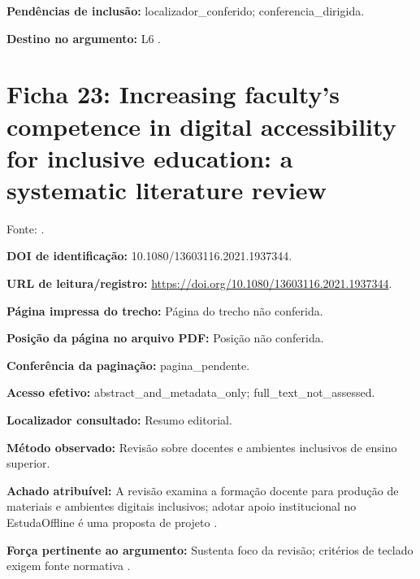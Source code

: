 \noindent\textbf{Pendências de inclusão:} localizador\_conferido; conferencia\_dirigida.\par\medskip

\noindent\textbf{Destino no argumento:} L6 .

\clearpage\section*{Ficha 23: Increasing faculty’s competence in digital accessibility for inclusive education: a systematic literature review}

Fonte: \citet{bong2021}.

\noindent\textbf{DOI de identificação:} 10.1080/13603116.2021.1937344.\par\medskip

\noindent\textbf{URL de leitura/registro:} \url{https://doi.org/10.1080/13603116.2021.1937344}.\par\medskip

\noindent\textbf{Página impressa do trecho:} Página do trecho não conferida.\par\medskip

\noindent\textbf{Posição da página no arquivo PDF:} Posição não conferida.\par\medskip

\noindent\textbf{Conferência da paginação:} pagina\_pendente.\par\medskip

\noindent\textbf{Acesso efetivo:} abstract\_and\_metadata\_only; full\_text\_not\_assessed.\par\medskip

\noindent\textbf{Localizador consultado:} Resumo editorial.\par\medskip

\noindent\textbf{Método observado:} Revisão sobre docentes e ambientes inclusivos de ensino superior.\par\medskip

\noindent\textbf{Achado atribuível:} A revisão examina a formação docente para produção de materiais e ambientes digitais inclusivos; adotar apoio institucional no EstudaOffline é uma proposta de projeto \citep{bong2021}.\par\medskip

\noindent\textbf{Força pertinente ao argumento:} Sustenta foco da revisão; critérios de teclado exigem fonte normativa \citep{bong2021}.\par\medskip

